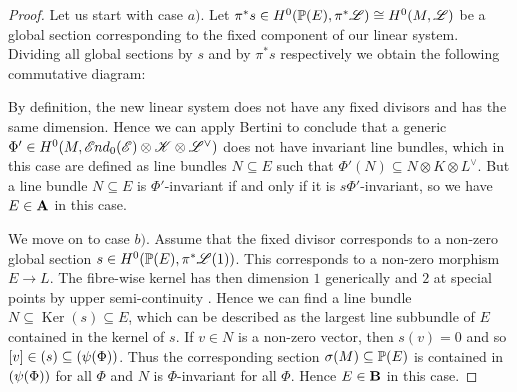 \documentclass[A4paper, 12pt, british, reqno]{amsart}
\let\div\relax
\DeclareMathOperator{\div}{div}
\DeclareMathOperator{\Ker}{Ker}
\newcommand{\ot}{\otimes}
\newcommand{\dual}{^{\vee}}
\begin{document}
\begin{lm}
\begin{proof}
	\color{gray}
	Let us start with case $a)$.
	Let $\pi^{*}s\in H^{0}(\P(E),\pi^{*}\L)\cong H^{0}(M,\L)$ be a global section corresponding to the fixed component of our linear system.
	Dividing all global sections by $s$ and by $\pi^{*}s$ respectively we obtain the following commutative diagram:
	\begin{center}
	\end{center}
	By definition, the new linear system does not have any fixed divisors and has the same dimension.
	Hence we can apply Bertini to conclude that a generic $\Phi'\in H^{0}(M,\sEnd_{0}(\E)\ot \sK\ot \L\dual)$ does not have invariant line bundles, which in this case are defined as line bundles $N\subseteq E$ such that $\Phi'(N)\subseteq N\ot K\ot L\dual$.
	But a line bundle $N\subseteq E$ is $\Phi'$-invariant if and only if it is $s\Phi'$-invariant, so we have $E\in \bfA$ in this case.

	We move on to case $b)$.
	Assume that the fixed divisor corresponds to a non-zero global section $s\in H^{0}(\P(E),\pi^{*}\L(1))$.
	This corresponds to a non-zero morphism $E\to L$.
	The fibre-wise kernel has then dimension $1$ generically and $2$ at special points by upper semi-continuity \cite[Proposition 1.3.2]{ati89}.
	Hence we can find a line bundle $N\subseteq \Ker(s)\subseteq E$, which can be described as the largest line subbundle of $E$ contained in the kernel of $s$.
	If $v\in N$ is a non-zero vector, then $s(v)=0$ and so $[v]\in \div(s)\subseteq \div(\psi(\Phi))$.
	Thus the corresponding section $\sigma(M)\subseteq \P(E)$ is contained in $\div(\psi(\Phi))$ for all $\Phi$ and $N$ is $\Phi$-invariant for all $\Phi$.
	Hence $E\in \bfB$ in this case.


\end{proof}
\end{lm}
\end{document}
